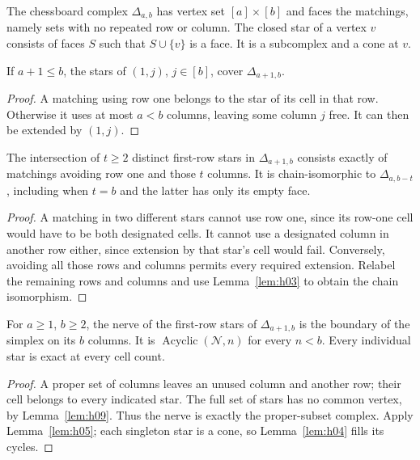 The chessboard complex \(\Delta_{a,b}\) has vertex set \([a]\times[b]\)
and faces the matchings, namely sets with no repeated row or column.
The closed star of a vertex \(v\) consists of faces \(S\) such that
\(S\cup\{v\}\) is a face. It is a subcomplex and a cone at \(v\).

\begin{lemma}\label{lem:h08}
If \(a+1\le b\), the stars of \((1,j)\), \(j\in[b]\), cover
\(\Delta_{a+1,b}\).
\end{lemma}
\begin{proof}
A matching using row one belongs to the star of its cell in that row.
Otherwise it uses at most \(a<b\) columns, leaving some column \(j\)
free. It can then be extended by \((1,j)\).
\end{proof}

\begin{lemma}\label{lem:h09}
The intersection of \(t\ge2\) distinct first-row stars in
\(\Delta_{a+1,b}\) consists exactly of matchings avoiding row one and
those \(t\) columns. It is chain-isomorphic to \(\Delta_{a,b-t}\),
including when \(t=b\) and the latter has only its empty face.
\end{lemma}
\begin{proof}
A matching in two different stars cannot use row one, since its row-one
cell would have to be both designated cells. It cannot use a designated
column in another row either, since extension by that star's cell would
fail. Conversely, avoiding all those rows and columns permits every
required extension. Relabel the remaining rows and columns and use
Lemma~\ref{lem:h03} to obtain the chain isomorphism.
\end{proof}

\begin{lemma}\label{lem:h10}
For \(a\ge1\), \(b\ge2\), the nerve of the first-row stars of
\(\Delta_{a+1,b}\) is the boundary of the simplex on its \(b\) columns.
It is \(\operatorname{Acyclic}(\mathcal N,n)\) for every \(n<b\).
Every individual star is exact at every cell count.
\end{lemma}
\begin{proof}
A proper set of columns leaves an unused column and another row; their
cell belongs to every indicated star. The full set of stars has no
common vertex, by Lemma~\ref{lem:h09}. Thus the nerve is exactly the
proper-subset complex. Apply Lemma~\ref{lem:h05}; each singleton star
is a cone, so Lemma~\ref{lem:h04} fills its cycles.
\end{proof}

